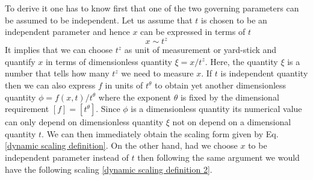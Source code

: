 	To derive it one has to know first that one of the two governing parameters can be assumed to be independent. Let us assume that $t$ is	chosen to be an independent parameter and hence $x$ can be expressed	in terms of $t$
	\begin{equation}
		x \sim t^z
	\end{equation}
	It implies that we can choose $t^z$ as unit of measurement or yard-stick and quantify $x$ in terms of dimensionless quantity $\xi=x/t^z$. Here, the	quantity $\xi$ is a number that tells how many $t^z$ we need to measure $x$.	If $t$ is independent quantity then we can also express $f$ in units of $t^\theta$	to obtain yet another dimensionless quantity $\phi = f (x, t)/t^\theta$ where the	exponent $\theta$ is fixed by the dimensional requirement $\left[f\right] = \left[t^\theta\right]$. Since $\phi$ is a dimensionless quantity its numerical value can only depend on dimensionless quantity $\xi$ not on depend on a dimensional quantity $t$. We
	can then immediately obtain the scaling form given by Eq. \ref{dynamic scaling definition}. On	the other hand, had we choose $x$ to be independent parameter instead of	$t$ then following the same argument we would have the following scaling \ref{dynamic scaling definition 2}.
